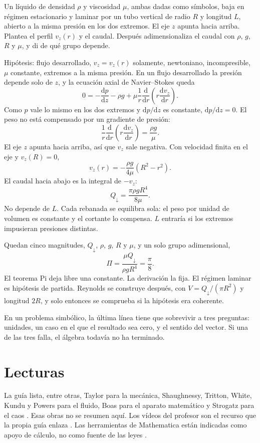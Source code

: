 \begin{problembox}
Un líquido de densidad \(\rho\) y viscosidad \(\mu\), ambas dadas como símbolos, baja en régimen estacionario y laminar por un tubo vertical de radio \(R\) y longitud \(L\), abierto a la misma presión en los dos extremos. El eje \(z\) apunta hacia arriba. Plantea el perfil \(v_z(r)\) y el caudal. Después adimensionaliza el caudal con \(\rho\), \(g\), \(R\) y \(\mu\), y di de qué grupo depende.
\end{problembox}
\begin{solutionbox}
Hipótesis: flujo desarrollado, \(v_z=v_z(r)\) solamente, newtoniano, incompresible, \(\mu\) constante, extremos a la misma presión. En un flujo desarrollado la presión depende solo de \(z\), y la ecuación axial de Navier--Stokes queda
\[
0=-\frac{\mathrm{d}p}{\mathrm{d}z}-\rho g+\mu\frac{1}{r}\frac{\mathrm{d}}{\mathrm{d}r}\left(r\frac{\mathrm{d}v_z}{\mathrm{d}r}\right).
\]
Como \(p\) vale lo mismo en los dos extremos y \(\mathrm{d}p/\mathrm{d}z\) es constante, \(\mathrm{d}p/\mathrm{d}z=0\). El peso no está compensado por un gradiente de presión:
\[
\frac{1}{r}\frac{\mathrm{d}}{\mathrm{d}r}\left(r\frac{\mathrm{d}v_z}{\mathrm{d}r}\right)=\frac{\rho g}{\mu}.
\]
El eje \(z\) apunta hacia arriba, así que \(v_z\) sale negativa. Con velocidad finita en el eje y \(v_z(R)=0\),
\[
v_z(r)=-\frac{\rho g}{4\mu}(R^2-r^2).
\]
El caudal hacia abajo es la integral de \(-v_z\):
\[
Q_{\downarrow}=\frac{\pi\rho g R^4}{8\mu}.
\]
No depende de \(L\). Cada rebanada se equilibra sola: el peso por unidad de volumen es constante y el cortante lo compensa. \(L\) entraría si los extremos impusieran presiones distintas.

Quedan cinco magnitudes, \(Q_{\downarrow}\), \(\rho\), \(g\), \(R\) y \(\mu\), y un solo grupo adimensional,
\[
\Pi=\frac{\mu Q_{\downarrow}}{\rho g R^4}=\frac{\pi}{8}.
\]
El teorema Pi deja libre una constante. La derivación la fija. El régimen laminar es hipótesis de partida. Reynolds se construye después, con \(V=Q_{\downarrow}/(\pi R^2)\) y longitud \(2R\), y solo entonces se comprueba si la hipótesis era coherente.
\end{solutionbox}

\begin{tipbox}
En un problema simbólico, la última línea tiene que sobrevivir a tres preguntas: unidades, un caso en el que el resultado sea cero, y el sentido del vector. Si una de las tres falla, el álgebra todavía no ha terminado.
\end{tipbox}

\section{Lecturas}

La guía lista, entre otras, Taylor para la mecánica, Shaughnessy, Tritton, White, Kundu y Powers para el fluido, Boas para el aparato matemático y Strogatz para el caos \parencite{taylor2005,shaughnessy2005,tritton2011,white2016,kundu2016,powers2024,boas2006,strogatz2018}. Esas obras no se resumen aquí. Los vídeos del profesor son el recurso que la propia guía enlaza \parencite{zoritaVideos}. Las herramientas de Mathematica están indicadas como apoyo de cálculo, no como fuente de las leyes \parencite{wolframResources}.
